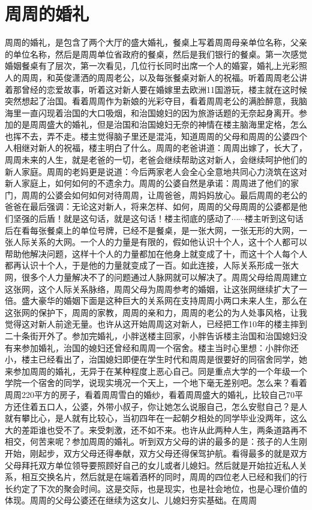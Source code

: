 \section{周周的婚礼}

周周的婚礼，是包含了两个大厅的盛大婚礼，餐桌上写着周周母亲单位名称，父亲的单位名称，然后是周周单位省政府的餐桌，然后是我们银行的餐桌。第一次感觉婚姻餐桌有了层次，第一次看见，几位行长同时出席一个人的婚宴，婚礼上光彩照人的周周，和英俊潇洒的周周老公，以及每张餐桌对新人的祝福。听着周周老公讲着那曾经的恋爱故事，听着这对新人要在婚嫁里去欧洲11国游玩，楼主就在这时候突然想起了治国。看着周周作为新娘的光彩夺目，看着周周老公的满脸醉意，我脑海里一直闪现着治国的大口吸烟，和治国媳妇的因为旅游话题的无奈起身离开。参加的是周周盛大的婚礼，但是治国和治国媳妇无奈的神情在楼主脑海里定格，怎么也挥不去，弄不走。楼主觉得脑子里还是混沌，知道周周的父母和周周的公婆四个人相继对新人的祝福，楼主明白了什么。周周的老爸讲道：周周出嫁了，长大了，周周未来的人生，就是老爸的一切，老爸会继续帮助这对新人，会继续呵护他们的新人家庭。周周的老妈更是说道：今后两家老人会全心全意地共同心力浇筑在这对新人家庭上，如何如何的不遗余力。周周的公婆自然是承诺：周周进了他们的家门，周周的公婆会如何如何对待周周，让周爸爸，周妈妈放心。最后周周的老公的爸爸在最后强调：无论这对新人，将来怎样、如何，周周的父母周周的公婆都是他们坚强的后盾！就是这句话，就是这句话！楼主彻底的感动了$\cdots\cdots$楼主听到这句话后在看每张餐桌上的单位号牌，已经不是餐桌，是一张大网，一张无形的大网，一张人际关系的大网。一个人的力量是有限的，假如他认识十个人，这十个人都可以帮助他解决问题，这样十个人的力量都加在他身上就变成了十，而这十个人每个人都再认识十个人，于是他的力量就变成了一百。如此连接，人际关系形成一张大网，很多个人力量解决不了的问题通过人脉网就可以解决了。周周父母给周周建立这张网，这个人际关系脉络，周周父母为周周参考的婚姻，让这张网继续扩大了一倍。盛大豪华的婚姻下面是这种巨大的关系网在支持周周小两口未来人生，那么在这张网的保护下，周周的家教，周周的亲和力，周周的老公的为人处事风格，让我觉得这对新人前途无量。也许从这开始周周这对新人，已经把工作10年的楼主摔到二十条街开外了。参加完婚礼，小胖送楼主回家，小胖告诉楼主治国和治国媳妇没有来参加婚礼，治国的媳妇还曾经和周周一个宿舍。楼主当时心里想：小胖你还小，楼主已经看出了，治国媳妇即便在学生时代和周周是很要好的同宿舍同学，她来参加周周的婚礼，无异于在某种程度上恶心自己。同是重点大学的一个年级一个学院一个宿舍的同学，说现实境况一个天上，一个地下毫无差别吧。怎么来？看着周周220平方的房子，看着周周雪白的婚纱，看着周周盛大的婚礼，比较自己70平方还住着五口人，公婆，外带小叔子，你让她怎么说服自己，怎么安慰自己？是人就有攀比心，是人就有比较心，当初四年在一起朝夕相处的同学毕业没两年，这么大的差距谁也受不了。来受刺激，还不如不来。也许从此两种人生，两条道路再不相交，何苦来呢？参加周周的婚礼。听到双方父母的讲的最多的是：孩子的人生刚开始，刚起步，双方父母还得奉献，双方父母还得保驾护航。看得最多的就是双方父母拜托双方单位领导要照顾好自己的女儿或者儿媳妇。然后就是开始拉近私人关系，相互交换名片，然后就是在端着酒杯的同时，周周的四位老人已经和我们的行长约定了下次的聚会时间。这是交际，也是现实，也是社会地位，也是心理价值的体现。周周的父母公婆还在继续为这女儿、儿媳妇夯实基础。在周周
